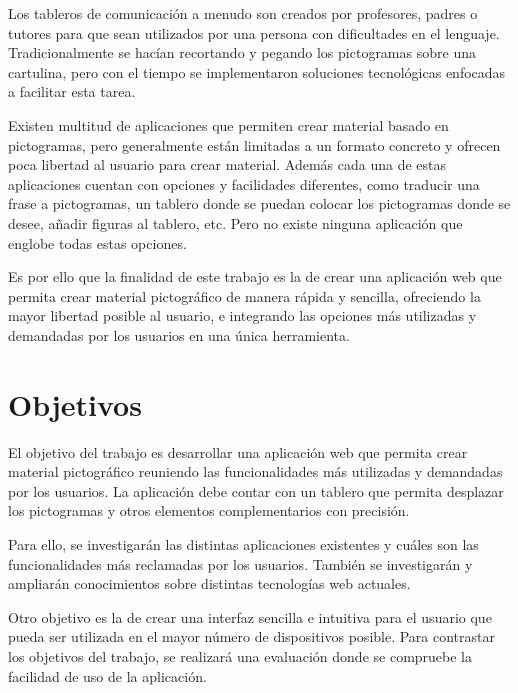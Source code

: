 Los tableros de comunicación a menudo son creados por profesores, padres o tutores para que sean utilizados por una persona con dificultades en el lenguaje. Tradicionalmente se hacían recortando y pegando los pictogramas sobre una cartulina, pero con el tiempo se implementaron soluciones tecnológicas enfocadas a facilitar esta tarea. 

Existen multitud de aplicaciones que permiten crear material basado en pictogramas, pero generalmente están limitadas a un formato concreto y ofrecen poca libertad al usuario para crear material. Además cada una de estas aplicaciones cuentan con opciones y facilidades diferentes, como traducir una frase a pictogramas, un tablero donde se puedan colocar los pictogramas donde se desee, añadir figuras al tablero, etc. Pero no existe ninguna aplicación que englobe todas estas opciones. 

Es por ello que la finalidad de este trabajo es la de crear una aplicación web que permita crear material pictográfico de manera rápida y sencilla, ofreciendo la mayor libertad posible al usuario, e integrando las opciones más utilizadas y demandadas por los usuarios en una única herramienta. 
 





\section{Objetivos}
\label{cap1:sec:Objetivos}



El objetivo del trabajo es desarrollar una aplicación web que permita crear material pictográfico reuniendo las funcionalidades más utilizadas y demandadas por los usuarios. La aplicación debe contar con un tablero que permita desplazar los pictogramas y otros elementos complementarios con precisión.

Para ello, se investigarán las distintas aplicaciones existentes y cuáles son las funcionalidades más reclamadas por los usuarios. También se investigarán y ampliarán conocimientos sobre distintas tecnologías web actuales. 

Otro objetivo es la de crear una interfaz sencilla e intuitiva para el usuario que pueda ser utilizada en el mayor número de dispositivos posible. Para contrastar los objetivos del trabajo, se realizará una evaluación donde se compruebe la facilidad de uso de la aplicación. 










